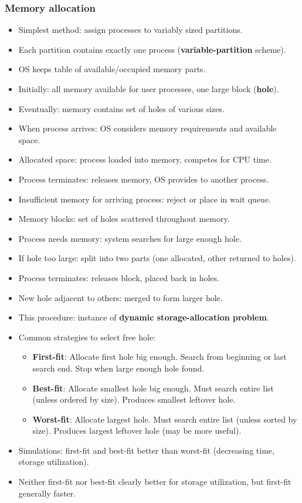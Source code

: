 \subsubsection*{Memory allocation}
\begin{itemize}
    \item Simplest method: assign processes to variably sized partitions.
    \item Each partition contains exactly one process (\textbf{variable-partition} scheme).
    \item OS keeps table of available/occupied memory parts.
    \item Initially: all memory available for user processes, one large block (\textbf{hole}).
    \item Eventually: memory contains set of holes of various sizes.
    \item When process arrives: OS considers memory requirements and available space.
    \item Allocated space: process loaded into memory, competes for CPU time.
    \item Process terminates: releases memory, OS provides to another process.
    \item Insufficient memory for arriving process: reject or place in wait queue.
    \item Memory blocks: set of holes scattered throughout memory.
    \item Process needs memory: system searches for large enough hole.
    \item If hole too large: split into two parts (one allocated, other returned to holes).
    \item Process terminates: releases block, placed back in holes.
    \item New hole adjacent to others: merged to form larger hole.
    \item This procedure: instance of \textbf{dynamic storage-allocation problem}.
    \item Common strategies to select free hole:
    \begin{itemize}
        \item \textbf{First-fit}: Allocate first hole big enough. Search from beginning or last search end. Stop when large enough hole found.
        \item \textbf{Best-fit}: Allocate smallest hole big enough. Must search entire list (unless ordered by size). Produces smallest leftover hole.
        \item \textbf{Worst-fit}: Allocate largest hole. Must search entire list (unless sorted by size). Produces largest leftover hole (may be more useful).
    \end{itemize}
    \item Simulations: first-fit and best-fit better than worst-fit (decreasing time, storage utilization).
    \item Neither first-fit nor best-fit clearly better for storage utilization, but first-fit generally faster.
\end{itemize}

